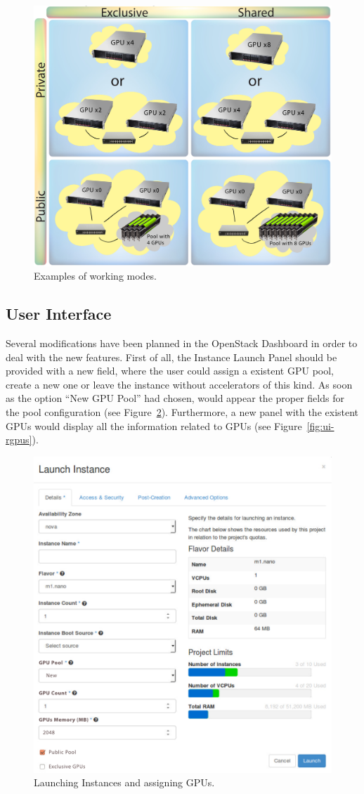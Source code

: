 \documentclass[a4paper,twoside]{article}
\begin{document}
\begin{figure}[htb]
  \centering
  \includegraphics[width=.5\textwidth]{images/workingmodes.jpg}
  \caption{Examples of working modes.}
  \label{fig2}
\end{figure}

\subsection{User Interface}
Several modifications have been planned in the OpenStack Dashboard in order to deal with the new features.
First of all, the Instance Launch Panel should be provided with a new field, where the user could assign a existent GPU pool, create a new one or leave the instance without accelerators of this kind.
As soon as the option ``New GPU Pool'' had chosen, would appear the proper fields for the pool configuration (see Figure~\ref{fig:ui-launch}).
Furthermore, a new panel with the existent GPUs would display all the information related to GPUs (see Figure~\ref{fig:ui-rgpus}).

\begin{figure}[htb]
  \centering
  \includegraphics[width=\linewidth]{images/UI-launch.pdf}
  \caption{Launching Instances and assigning GPUs.}
  \label{fig:ui-launch}
\end{figure}
  
\end{document}
